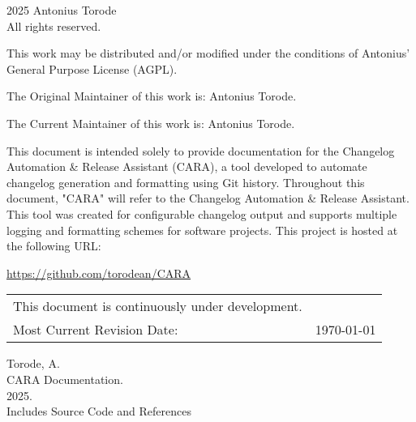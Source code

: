 \pagestyle{empty}
\begingroup
\footnotesize
\parindent 0pt
\parskip \baselineskip
\textcopyright{} 2025 Antonius Torode \\
All rights reserved.

This work may be distributed and/or modified under the conditions of Antonius’ General Purpose License (AGPL).

The Original Maintainer of this work is: Antonius Torode.

The Current Maintainer of this work is: Antonius Torode.

This document is intended solely to provide documentation for the Changelog Automation \& Release Assistant (CARA), a tool developed to automate changelog generation and formatting using Git history. Throughout this document, "CARA" will refer to the Changelog Automation \& Release Assistant. This tool was created for configurable changelog output and supports multiple logging and formatting schemes for software projects. This project is hosted at the following URL:

\begin{center}
	\url{https://github.com/torodean/CARA}
\end{center}


\begin{center}
\begin{tabular}{ll}
This document is continuously under development. \\
Most Current Revision Date: &  \today 
\end{tabular}
\end{center}

\vfill

Torode, A.\\
\hspace*{1em} CARA Documentation. \\
\hspace*{2em} 2025. \\
\hspace*{2em} Includes Source Code and References \\


\endgroup
\clearpage